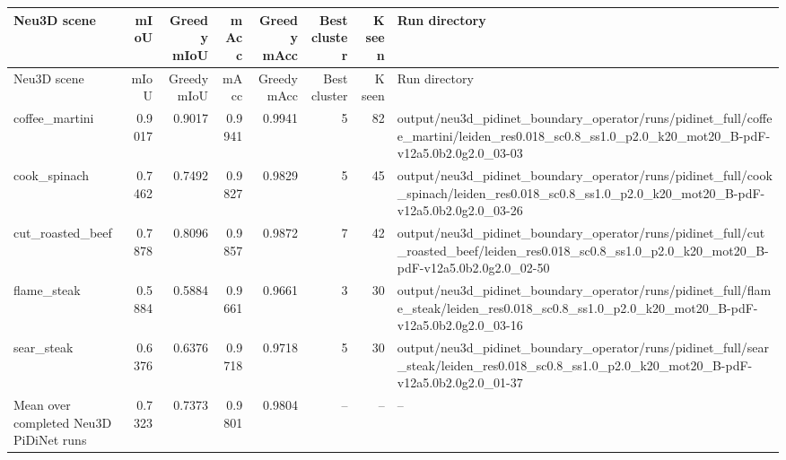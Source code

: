 \documentclass[10pt]{article}
\begin{document}
\small
\begin{longtable}{lrrrrrrp{9cm}}
\toprule
Neu3D scene & mIoU & Greedy mIoU & mAcc & Greedy mAcc & Best cluster & K seen & Run directory \\
\midrule
\endfirsthead
\toprule
Neu3D scene & mIoU & Greedy mIoU & mAcc & Greedy mAcc & Best cluster & K seen & Run directory \\
\midrule
\endhead
coffee\_martini & 0.9017 & 0.9017 & 0.9941 & 0.9941 & 5 & 82 & output/neu3d\_pidinet\_boundary\_operator/runs/pidinet\_full/coffee\_martini/leiden\_res0.018\_sc0.8\_ss1.0\_p2.0\_k20\_mot20\_B-pdF-v12a5.0b2.0g2.0\_03-03 \\
cook\_spinach & 0.7462 & 0.7492 & 0.9827 & 0.9829 & 5 & 45 & output/neu3d\_pidinet\_boundary\_operator/runs/pidinet\_full/cook\_spinach/leiden\_res0.018\_sc0.8\_ss1.0\_p2.0\_k20\_mot20\_B-pdF-v12a5.0b2.0g2.0\_03-26 \\
cut\_roasted\_beef & 0.7878 & 0.8096 & 0.9857 & 0.9872 & 7 & 42 & output/neu3d\_pidinet\_boundary\_operator/runs/pidinet\_full/cut\_roasted\_beef/leiden\_res0.018\_sc0.8\_ss1.0\_p2.0\_k20\_mot20\_B-pdF-v12a5.0b2.0g2.0\_02-50 \\
flame\_steak & 0.5884 & 0.5884 & 0.9661 & 0.9661 & 3 & 30 & output/neu3d\_pidinet\_boundary\_operator/runs/pidinet\_full/flame\_steak/leiden\_res0.018\_sc0.8\_ss1.0\_p2.0\_k20\_mot20\_B-pdF-v12a5.0b2.0g2.0\_03-16 \\
sear\_steak & 0.6376 & 0.6376 & 0.9718 & 0.9718 & 5 & 30 & output/neu3d\_pidinet\_boundary\_operator/runs/pidinet\_full/sear\_steak/leiden\_res0.018\_sc0.8\_ss1.0\_p2.0\_k20\_mot20\_B-pdF-v12a5.0b2.0g2.0\_01-37 \\
Mean over completed Neu3D PiDiNet runs & 0.7323 & 0.7373 & 0.9801 & 0.9804 & -- & -- & -- \\
\bottomrule
\end{longtable}
\normalsize
\end{document}
